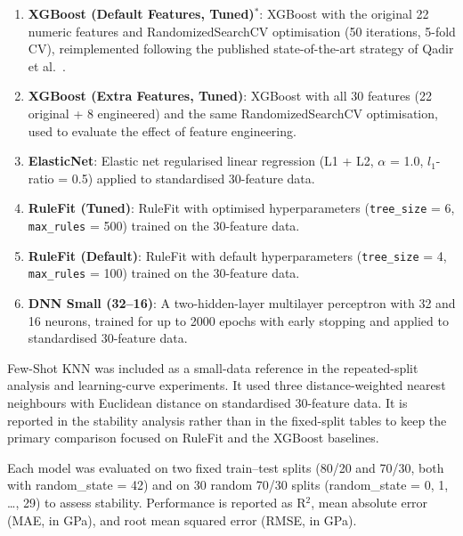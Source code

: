 \documentclass[pdflatex,sn-mathphys-num]{sn-jnl}%
\theoremstyle{thmstyleone}%
\theoremstyle{thmstyletwo}%
\theoremstyle{thmstylethree}%
\begin{document}
\begin{enumerate}
    \item \textbf{XGBoost (Default Features, Tuned)$^{*}$}: XGBoost with the original 22 numeric features and RandomizedSearchCV optimisation (50 iterations, 5-fold CV), reimplemented following the published state-of-the-art strategy of Qadir et al.~\cite{qadir2024predicting}.
    \item \textbf{XGBoost (Extra Features, Tuned)}: XGBoost with all 30 features (22 original + 8 engineered) and the same RandomizedSearchCV optimisation, used to evaluate the effect of feature engineering.
    \item \textbf{ElasticNet}: Elastic net regularised linear regression (L1 + L2, $\alpha$ = 1.0, $l_1$-ratio = 0.5) applied to standardised 30-feature data.
    \item \textbf{RuleFit (Tuned)}: RuleFit with optimised hyperparameters (\texttt{tree\_size} = 6, \texttt{max\_rules} = 500) trained on the 30-feature data.
    \item \textbf{RuleFit (Default)}: RuleFit with default hyperparameters (\texttt{tree\_size} = 4, \texttt{max\_rules} = 100) trained on the 30-feature data.
    \item \textbf{DNN Small (32--16)}: A two-hidden-layer multilayer perceptron with 32 and 16 neurons, trained for up to 2000 epochs with early stopping and applied to standardised 30-feature data.
\end{enumerate}

Few-Shot KNN was included as a small-data reference in the repeated-split analysis and learning-curve experiments. It used three distance-weighted nearest neighbours with Euclidean distance on standardised 30-feature data. It is reported in the stability analysis rather than in the fixed-split tables to keep the primary comparison focused on RuleFit and the XGBoost baselines.

Each model was evaluated on two fixed train--test splits (80/20 and 70/30, both with random\_state = 42) and on 30 random 70/30 splits (random\_state = 0, 1, \ldots, 29) to assess stability. Performance is reported as R$^2$, mean absolute error (MAE, in GPa), and root mean squared error (RMSE, in GPa).
\end{document}
